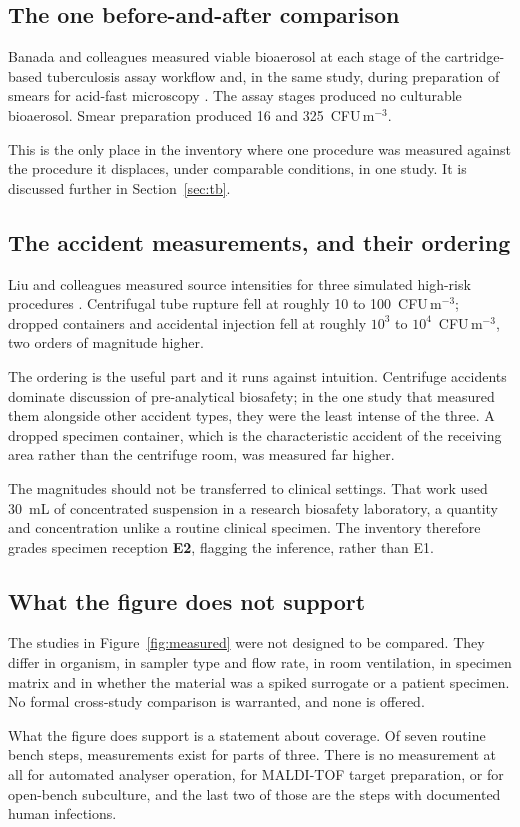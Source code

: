 \subsection{The one before-and-after comparison}

Banada and colleagues measured viable bioaerosol at each stage of the
cartridge-based tuberculosis assay workflow and, in the same study, during
preparation of smears for acid-fast microscopy \cite{banada2010}. The assay
stages produced no culturable bioaerosol. Smear preparation produced 16 and
325~CFU\,m$^{-3}$.

This is the only place in the inventory where one procedure was measured
against the procedure it displaces, under comparable conditions, in one study.
It is discussed further in Section~\ref{sec:tb}.

\subsection{The accident measurements, and their ordering}

Liu and colleagues measured source intensities for three simulated high-risk
procedures \cite{liu2023}. Centrifugal tube rupture fell at roughly 10 to
100~CFU\,m$^{-3}$; dropped containers and accidental injection fell at roughly
$10^{3}$ to $10^{4}$~CFU\,m$^{-3}$, two orders of magnitude higher.

The ordering is the useful part and it runs against intuition. Centrifuge
accidents dominate discussion of pre-analytical biosafety; in the one study
that measured them alongside other accident types, they were the least intense
of the three. A dropped specimen container, which is the characteristic
accident of the receiving area rather than the centrifuge room, was measured
far higher.

The magnitudes should not be transferred to clinical settings. That work used
30~mL of concentrated suspension in a research biosafety laboratory, a quantity
and concentration unlike a routine clinical specimen. The inventory therefore
grades specimen reception \textbf{E2}, flagging the inference, rather than E1.

\subsection{What the figure does not support}

The studies in Figure~\ref{fig:measured} were not designed to be compared.
They differ in organism, in sampler type and flow rate, in room ventilation,
in specimen matrix and in whether the material was a spiked surrogate or a
patient specimen. No formal cross-study comparison is warranted, and none is
offered.

What the figure does support is a statement about coverage. Of seven routine
bench steps, measurements exist for parts of three. There is no measurement at
all for automated analyser operation, for MALDI-TOF target preparation, or for
open-bench subculture, and the last two of those are the steps with documented
human infections.
